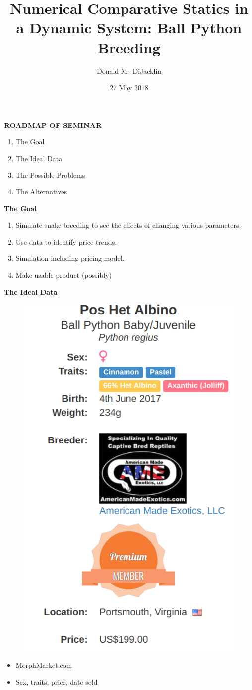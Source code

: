 \documentclass[grey,handout]{beamer}
\renewcommand{\frametitle}[1]{\begin{center}\textbf{#1}\end{center}}
\begin{document}
\title{Numerical Comparative Statics in a Dynamic System: Ball Python Breeding}

\author{Donald M.~DiJacklin}
\date{27 May 2018}

\begin{frame}
  \titlepage
\end{frame}

\begin{frame}
\frametitle{ROADMAP OF SEMINAR}
  \begin{enumerate}[<+->]
    \item The Goal
    \item The Ideal Data
    \item The Possible Problems
    \item The Alternatives
  \end{enumerate}
\end{frame}


\begin{frame}
\frametitle{The Goal}
  \begin{enumerate}[<+->]
    \item Simulate snake breeding to see the effects of changing various parameters.
    \item Use data to identify price trends.
    \item Simulation including pricing model.
    \item Make usable product (possibly)
  \end{enumerate}
  

\end{frame}
\begin{frame}
  \frametitle{The Ideal Data}
  \begin{multicols}{2}
  \begin{figure}[H]
  \centering
  \includegraphics[width=.3\textwidth]{priceTraits.png}
  \end{figure}
  \begin{itemize}
  \item MorphMarket.com
  \item Sex, traits, price, date sold
  \end{itemize}
  \end{multicols}
\end{frame}
\end{document}
